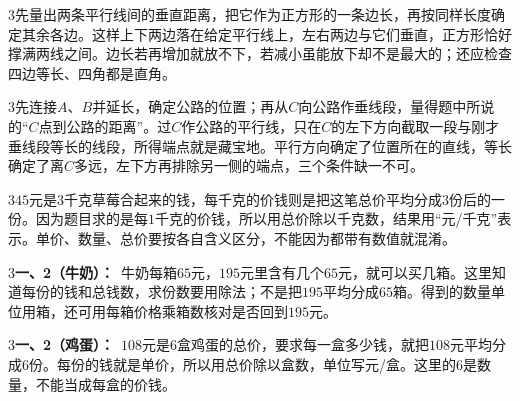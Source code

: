 \documentclass[multi=snippet,border={5bp 20bp 5bp 5bp}]{standalone}
\newenvironment{snippet}[3]{\begin{minipage}{#1bp}\color{answerred}\fontsize{#2}{#3}\selectfont\raggedright}{\end{minipage}}
\begin{document}
\begin{snippet}{505}{11.5}{14}\begin{multicols}{3}\raggedcolumns 先量出两条平行线间的垂直距离，把它作为正方形的一条边长，再按同样长度确定其余各边。这样上下两边落在给定平行线上，左右两边与它们垂直，正方形恰好撑满两线之间。边长若再增加就放不下，若减小虽能放下却不是最大的；还应检查四边等长、四角都是直角。\end{multicols}\end{snippet}
\begin{snippet}{505}{11.5}{14}\begin{multicols}{3}\raggedcolumns 先连接\(A\)\allowbreak 、\(B\)\allowbreak 并延长，确定公路的位置；再从\(C\)\allowbreak 向公路作垂线段，量得题中所说的“\(C\)\allowbreak 点到公路的距离”。过\(C\)\allowbreak 作公路的平行线，只在\(C\)\allowbreak 的左下方向截取一段与刚才垂线段等长的线段，所得端点就是藏宝地。平行方向确定了位置所在的直线，等长确定了离\(C\)\allowbreak 多远，左下方再排除另一侧的端点，三个条件缺一不可。\end{multicols}\end{snippet}
\begin{snippet}{505}{11.5}{14}\begin{multicols}{3}\raggedcolumns \(45\)\allowbreak 元是\(3\)\allowbreak 千克草莓合起来的钱，每千克的价钱则是把这笔总价平均分成\(3\)\allowbreak 份后的一份。因为题目求的是每\(1\)\allowbreak 千克的价钱，所以用总价除以千克数，结果用“元/千克”表示。单价、数量、总价要按各自含义区分，不能因为都带有数值就混淆。\end{multicols}\end{snippet}
\begin{snippet}{505}{11.5}{14}\begin{multicols}{3}\raggedcolumns \textbf{一、2（牛奶）：}\ 牛奶每箱\(65\)\allowbreak 元，\(195\)\allowbreak 元里含有几个\(65\)\allowbreak 元，就可以买几箱。这里知道每份的钱和总钱数，求份数要用除法；不是把\(195\)\allowbreak 平均分成\(65\)\allowbreak 箱。得到的数量单位用箱，还可用每箱价格乘箱数核对是否回到\(195\)\allowbreak 元。\end{multicols}\end{snippet}
\begin{snippet}{505}{11.5}{14}\begin{multicols}{3}\raggedcolumns \textbf{一、2（鸡蛋）：}\ \(108\)\allowbreak 元是\(6\)\allowbreak 盒鸡蛋的总价，要求每一盒多少钱，就把\(108\)\allowbreak 元平均分成\(6\)\allowbreak 份。每份的钱就是单价，所以用总价除以盒数，单位写元/盒。这里的\(6\)\allowbreak 是数量，不能当成每盒的价钱。\end{multicols}\end{snippet}
\end{document}
